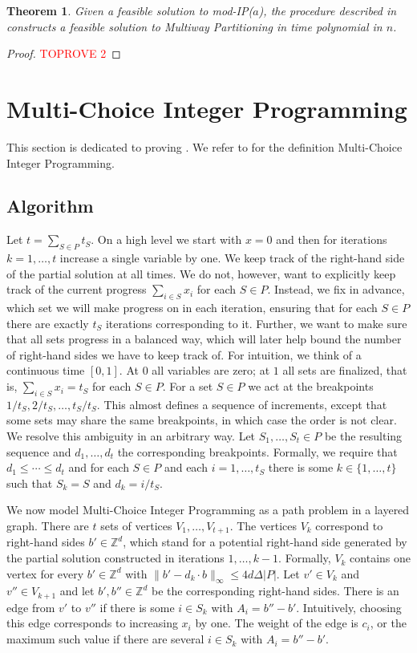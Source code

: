 \documentclass{article}
\newcommand{\Z}{\mathbb{Z}}
\newcommand{\mIP}{mod-IP($a$)}
\newtheorem{theorem}{Theorem}
\begin{document}
\begin{theorem}
	Given a feasible solution to \mIP, the procedure described in  constructs a feasible
	solution to Multiway Partitioning in time polynomial in $n$.
\end{theorem}
\begin{proof}\textcolor{red}{TOPROVE 2}\end{proof}


\section{Multi-Choice Integer Programming}
\label{sec:ilp}
This section is dedicated to proving .
We refer to  for the definition Multi-Choice Integer Programming.

\subsection{Algorithm}\label{sec:steinitz-alg}
Let $t = \sum_{S\in P} t_S$.
On a high level we start with $x = 0$ and then for iterations $k=1,\dotsc,t$ increase a single variable by one.
We keep track of the right-hand side of the partial solution at all times. We do not, however, want to
explicitly keep track of the current progress $\sum_{i\in S} x_i$ for each $S\in P$.
Instead, we fix in advance, which set we will make progress on in each iteration, ensuring that for each $S\in P$
there are exactly $t_S$ iterations corresponding to it.
Further, we want to make sure that all sets progress in a balanced way, which will later help bound the number
of right-hand sides we have to keep track of.
For intuition, we think of a continuous time $[0, 1]$. At $0$ all variables are zero; at $1$ all
sets are finalized, that is, $\sum_{i\in S} x_i = t_S$ for each $S\in P$.
For a set $S\in P$ we act at the breakpoints $1/t_S, 2/t_S,\dotsc,t_S/t_S$.
This almost defines a sequence of increments, except that some sets may share the same breakpoints, in which
case the order is not clear.
We resolve this ambiguity in an arbitrary way.
Let $S_1,\dotsc,S_t \in P$ be the resulting sequence and $d_1,\dotsc,d_t$ the corresponding breakpoints.
Formally, we require that $d_1\le \cdots \le d_t$ and for each $S\in P$ and each $i=1,\dotsc,t_S$ there
is some $k \in \{1,\dotsc,t\}$ such that $S_k = S$ and $d_k = i/t_S$.

We now model Multi-Choice Integer Programming as a path problem in a layered graph. There are $t$ sets
of vertices $V_1,\dotsc,V_{t+1}$. The vertices $V_k$ correspond to right-hand sides $b'\in \Z^d$,
which stand for a potential right-hand side generated by the partial solution constructed in iterations $1,\dotsc,k-1$.
Formally,
$V_k$ contains one vertex for every $b'\in \Z^d$ with $\|b' - d_k \cdot b \|_{\infty}\le 4 d\Delta |P|$.
Let $v'\in V_k$ and $v'' \in V_{k+1}$ and let $b', b'' \in \Z^d$ be the corresponding right-hand sides.
There is an edge from $v'$ to $v''$ if there is some $i\in S_k$ with $A_i = b'' - b'$.
Intuitively, choosing this edge corresponds to increasing $x_i$ by one. The weight of the edge is $c_i$,
or the maximum such value if there are several $i\in S_k$ with $A_i = b'' - b'$.
\end{document}
